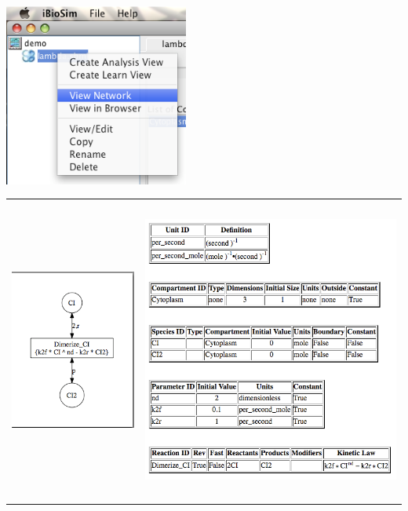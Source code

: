 \documentclass[titlepage,11pt]{article}
\begin{document}
\begin{enumerate}
\includegraphics[height=60mm]{screenshots/viewNet}\\
\begin{tabular}{cc}
\includegraphics[height=60mm]{screenshots/viewNetwork} &
\includegraphics[height=100mm]{screenshots/viewBrowser}
\end{tabular}

\clearpage


\end{enumerate}
\end{document}
